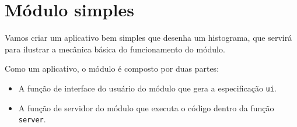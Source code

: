 \documentclass[
]{book}
\newenvironment{Shaded}{\begin{snugshade}}{\end{snugshade}}
\newcommand{\AttributeTok}[1]{\textcolor[rgb]{0.77,0.63,0.00}{#1}}
\newcommand{\ControlFlowTok}[1]{\textcolor[rgb]{0.13,0.29,0.53}{\textbf{#1}}}
\newcommand{\DecValTok}[1]{\textcolor[rgb]{0.00,0.00,0.81}{#1}}
\newcommand{\FunctionTok}[1]{\textcolor[rgb]{0.00,0.00,0.00}{#1}}
\newcommand{\NormalTok}[1]{#1}
\newcommand{\OtherTok}[1]{\textcolor[rgb]{0.56,0.35,0.01}{#1}}
\newcommand{\SpecialCharTok}[1]{\textcolor[rgb]{0.00,0.00,0.00}{#1}}
\newcommand{\StringTok}[1]{\textcolor[rgb]{0.31,0.60,0.02}{#1}}
\begin{document}
\hypertarget{muxf3dulo-simples}{%
\section{\texorpdfstring{\textbf{Módulo simples}}{Módulo simples}}\label{muxf3dulo-simples}}

Vamos criar um aplicativo bem simples que desenha um histograma, que servirá para ilustrar a mecânica básica do funcionamento do módulo.

\begin{Shaded}
\end{Shaded}

Como um aplicativo, o módulo é composto por duas partes:

\begin{itemize}
\item
  A função de interface do usuário do módulo que gera a especificação \texttt{ui}.
\item
  A função de servidor do módulo que executa o código dentro da função \texttt{server}.
\end{itemize}
\end{document}
